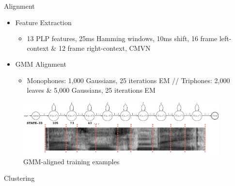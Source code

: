 \documentclass[final]{beamer} %
\newlength{\columnheight}
\begin{document}
\begin{frame}
\begin{columns}
\begin{column}{0.3\textwidth}
{        \vspace{.5cm}
      } %
    \end{column}

    \begin{column}{0.3\textwidth}
      \parbox[t][\columnheight]{.9\textwidth}{
        \vspace{.5cm}
        \begin{block}{\boxnumber Alignment}
          \begin{itemize}
          \item Feature Extraction
            \begin{itemize}
            \item 13 PLP features, 25ms Hamming windows, 10ms shift, 16 frame left-context \& 12 frame right-context, CMVN
            \end{itemize}
          \item GMM Alignment
            \begin{itemize}
            \item Monophones: 1,000 Gaussians, 25 iterations EM // Triphones: 2,000 leaves \& 5,000 Gaussians, 25 iterations EM
            \end{itemize}
          \end{itemize}
        \end{block}
  
        \vspace{.5cm}

        \begin{figure}[!htbp]
          \centering
          \includegraphics[width=\linewidth]{figs/aligned.png}
          \caption{GMM-aligned training examples}
          \endminipage\hfill
        \end{figure}
        
        \vspace{.5cm}
        
        \begin{block}{\boxnumber Clustering}
                    

\end{block}}
\end{column}
\end{columns}
\end{frame}
\end{document}
